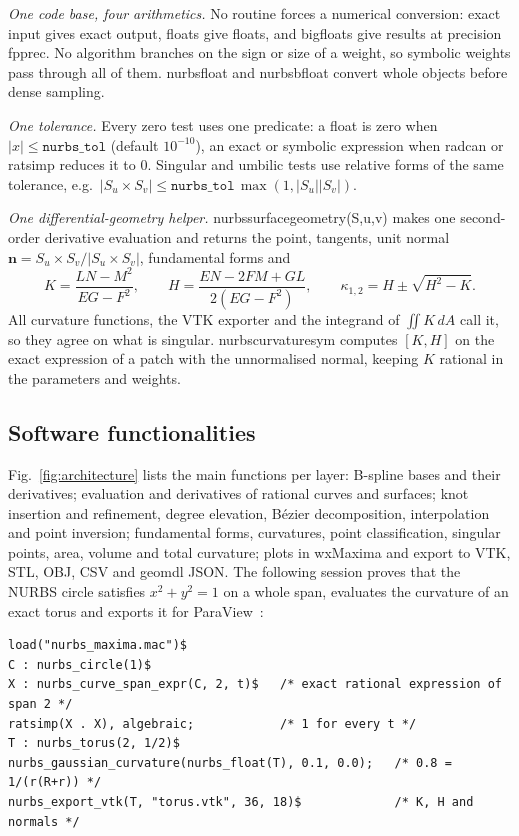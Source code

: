 \documentclass[preprint,12pt]{elsarticle}
\newcommand{\code}[1]{{\ttfamily\def\_{\textunderscore\allowbreak}#1}}
\begin{document}
\emph{One code base, four arithmetics.} No routine forces a numerical conversion: exact input gives exact output, floats give floats, and bigfloats give results at precision \code{fpprec}. No algorithm branches on the sign or size of a weight, so symbolic weights pass through all of them. \code{nurbs\_float} and \code{nurbs\_bfloat} convert whole objects before dense sampling.

\emph{One tolerance.} Every zero test uses one predicate: a float is zero when $|x|\le\mathtt{nurbs\_tol}$ (default $10^{-10}$), an exact or symbolic expression when \code{radcan} or \code{ratsimp} reduces it to 0. Singular and umbilic tests use relative forms of the same tolerance, e.g.\ $|S_u\times S_v|\le \mathtt{nurbs\_tol}\,\max(1,|S_u||S_v|)$.

\emph{One differential-geometry helper.} \code{nurbs\_surface\_geometry(S,u,v)} makes one second-order derivative evaluation and returns the point, tangents, unit normal $\mathbf n = S_u\times S_v/|S_u\times S_v|$, fundamental forms and~\cite{doCarmo1976}
\begin{equation}
K=\frac{LN-M^2}{EG-F^2},\qquad H=\frac{EN-2FM+GL}{2(EG-F^2)},\qquad \kappa_{1,2}=H\pm\sqrt{H^2-K}.
\label{eq:KH}
\end{equation}
All curvature functions, the VTK exporter and the integrand of $\iint K\,dA$ call it, so they agree on what is singular. \code{nurbs\_curvature\_sym} computes $[K,H]$ on the exact expression of a patch with the unnormalised normal, keeping $K$ rational in the parameters and weights.

\subsection{Software functionalities}
\label{sec:functionalities}

Fig.~\ref{fig:architecture} lists the main functions per layer: B-spline bases and their derivatives; evaluation and derivatives of rational curves and surfaces; knot insertion and refinement, degree elevation, Bézier decomposition, interpolation and point inversion; fundamental forms, curvatures, point classification, singular points, area, volume and total curvature; plots in wxMaxima and export to VTK, STL, OBJ, CSV and geomdl JSON. The following session proves that the NURBS circle satisfies $x^2+y^2=1$ on a whole span, evaluates the curvature of an exact torus and exports it for ParaView~\cite{Ahrens2005}:

\begin{lstlisting}
load("nurbs_maxima.mac")$
C : nurbs_circle(1)$
X : nurbs_curve_span_expr(C, 2, t)$   /* exact rational expression of span 2 */
ratsimp(X . X), algebraic;            /* 1 for every t */
T : nurbs_torus(2, 1/2)$
nurbs_gaussian_curvature(nurbs_float(T), 0.1, 0.0);   /* 0.8 = 1/(r(R+r)) */
nurbs_export_vtk(T, "torus.vtk", 36, 18)$             /* K, H and normals */
\end{lstlisting}
\end{document}
